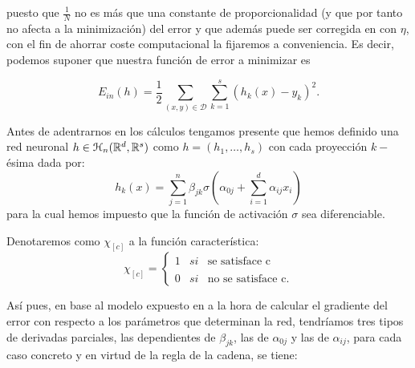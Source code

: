puesto que $\frac{1}{N}$ no es más que una constante de proporcionalidad (y que por tanto no afecta a la minimización) del error y que además 
puede ser corregida en  con $\eta$, con el fin de ahorrar coste computacional la 
fijaremos a conveniencia. Es decir, podemos suponer que 
nuestra función de error a minimizar es 

\begin{equation}
    E_{in}(h) = \frac{1}{2} \sum_{(x,y) \in \mathcal{D}} \sum_{k=1}^s (h_k(x)- y_k)^2. 
\end{equation}

Antes de adentrarnos en los cálculos tengamos presente que hemos definido una red neuronal  $h \in \mathcal{H}_n (\mathbb{R}^d, \mathbb{R}^s)$ como $h= (h_1, \ldots, h_s)$ con cada proyección $k-$ésima dada por: 
\begin{equation}\label{eq:red-neuronal-que-aprender}
    h_k(x) = 
    \sum_{j=1}^n \beta_{j k}
    \sigma
    \left(  
        \alpha_{0 j} +
        \sum_{i=1}^d \alpha_{i j}x_i
    \right)
\end{equation}
para la cual hemos impuesto que la función de activación $\sigma$ sea diferenciable.

Denotaremos como $\chi_{[c]}$ a la función característica:
\begin{equation}
    \chi_{[c]}= \left\{ \begin{array}{lcc}
        1 &   si  &  \text{se satisface c} \\
        \\ 0 &  si  & \text{no se satisface c.} 
        \end{array}
    \right. 
\end{equation}

Así pues, en base al modelo expuesto en  a la hora de calcular el gradiente del error con respecto a los parámetros que determinan la red, tendríamos tres tipos de derivadas parciales, las dependientes de $\beta_{j  k}$, 
las de $\alpha_{0 j}$ y las de $\alpha_{i j}$, para cada caso concreto y en virtud de la regla de la cadena, se tiene: 

